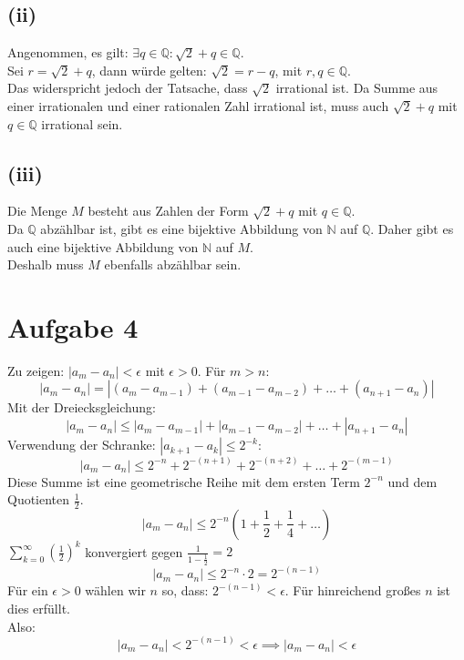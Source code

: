 \documentclass{article}
\begin{document}
\subsection*{(ii)}
Angenommen, es gilt: $\exists q \in \mathbb{Q}: \sqrt{2}+q \in \mathbb{Q}$. \\ 
Sei $r = \sqrt{2} + q$, dann würde gelten: $\sqrt{2} = r - q$, mit $r, q \in \mathbb{Q}$. \\
Das widerspricht jedoch der Tatsache, dass $\sqrt{2}$ irrational ist. Da Summe aus einer irrationalen und einer rationalen Zahl irrational ist, muss auch $\sqrt{2}+q$ mit $q \in \mathbb{Q}$ irrational sein.
\subsection*{(iii)}
Die Menge $M$ besteht aus Zahlen der Form $\sqrt{2} + q$ mit $q \in \mathbb{Q}$. \\
Da $\mathbb{Q}$ abzählbar ist, gibt es eine bijektive Abbildung von $\mathbb{N}$ auf $\mathbb{Q}$. Daher gibt es auch eine bijektive Abbildung von $\mathbb{N}$ auf $M$. \\
Deshalb muss $M$ ebenfalls abzählbar sein.

\section*{Aufgabe 4}
Zu zeigen: $|a_m - a_n| < \epsilon$ mit $\epsilon > 0$.
Für $m > n$:
\[|a_m - a_n| = |(a_m - a_{m - 1}) + (a_{m-1} - a_{m-2}) + \dots + (a_{n+1} - a_n)|\]
Mit der Dreiecksgleichung:
\[|a_m - a_n| \leq |a_m - a_{m - 1}| + |a_{m-1} - a_{m-2}| + \dots + |a_{n+1} - a_n|\]
Verwendung der Schranke: $|a_{k+1} - a_k| \leq 2^{-k}$:
\[|a_m - a_n| \leq 2^{-n} + 2^{-(n+1)} + 2^{-(n+2)}+ \dots + 2^{-(m-1)}\]
Diese Summe ist eine geometrische Reihe mit dem ersten Term $2^{-n}$ und dem Quotienten $\frac{1}{2}$.
\[|a_m - a_n| \leq 2^{-n}(1 + \frac{1}{2} + \frac{1}{4} + \dots)\]
$\sum_{k=0}^{\infty} (\frac{1}{2})^k$ konvergiert gegen $\frac{1}{1 - \frac{1}{2}} = 2$
\[|a_m - a_n| \leq 2^{-n} \cdot 2 = 2^{-(n-1)}\]
Für ein $\epsilon > 0$ wählen wir $n$ so, dass: $2^{-(n-1)} < \epsilon$. Für hinreichend großes $n$ ist dies erfüllt. \\
Also:
\[|a_m - a_n| < 2^{-(n-1)} < \epsilon \implies |a_m - a_n| < \epsilon\]
\end{document}
